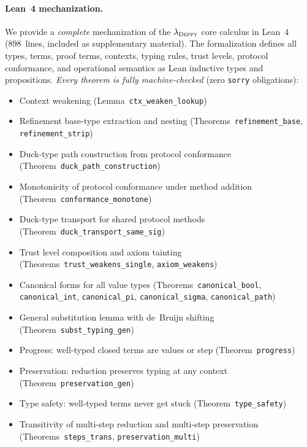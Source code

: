 \documentclass[acmsmall,nonacm,screen]{acmart}
\newcommand{\deppy}{\textsc{Deppy}}
\begin{document}
\paragraph{Lean~4 mechanization.}
We provide a \emph{complete} mechanization of the $\lambda_{\deppy}$
core calculus in Lean~4 (898~lines, included as supplementary material).
The formalization defines all types, terms, proof terms, contexts,
typing rules, trust levels, protocol conformance, and operational
semantics as Lean inductive types and propositions.
\emph{Every theorem is fully machine-checked} (zero \texttt{sorry}
obligations):
\begin{itemize}
\item Context weakening (Lemma~\texttt{ctx\_weaken\_lookup})
\item Refinement base-type extraction and nesting
  (Theorems~\texttt{refinement\_base}, \texttt{refinement\_strip})
\item Duck-type path construction from protocol conformance
  (Theorem~\texttt{duck\_path\_construction})
\item Monotonicity of protocol conformance under method addition
  (Theorem~\texttt{conformance\_monotone})
\item Duck-type transport for shared protocol methods
  (Theorem~\texttt{duck\_transport\_same\_sig})
\item Trust level composition and axiom tainting
  (Theorems~\texttt{trust\_weakens\_single},
   \texttt{axiom\_weakens})
\item Canonical forms for all value types
  (Theorems~\texttt{canonical\_bool}, \texttt{canonical\_int},
   \texttt{canonical\_pi}, \texttt{canonical\_sigma},
   \texttt{canonical\_path})
\item General substitution lemma with de~Bruijn shifting
  (Theorem~\texttt{subst\_typing\_gen})
\item Progress: well-typed closed terms are values or step
  (Theorem~\texttt{progress})
\item Preservation: reduction preserves typing at any context
  (Theorem~\texttt{preservation\_gen})
\item Type safety: well-typed terms never get stuck
  (Theorem~\texttt{type\_safety})
\item Transitivity of multi-step reduction and multi-step preservation
  (Theorems~\texttt{steps\_trans}, \texttt{preservation\_multi})
\end{itemize}


\end{document}
